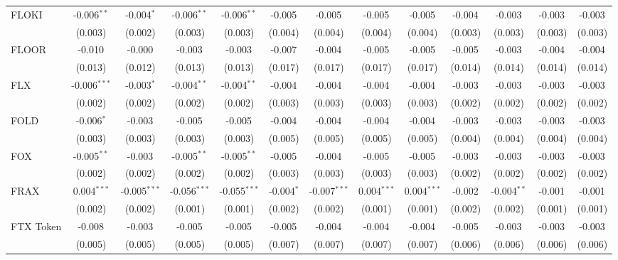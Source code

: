 \begin{table}[!htbp]
\begin{tabular}{@{\extracolsep{5pt}}lcccccccccccc}
 FLOKI & -0.006$^{**}$ & -0.004$^{*}$ & -0.006$^{**}$ & -0.006$^{**}$ & -0.005$^{}$ & -0.005$^{}$ & -0.005$^{}$ & -0.005$^{}$ & -0.004$^{}$ & -0.003$^{}$ & -0.003$^{}$ & -0.003$^{}$ \\
  & (0.003) & (0.002) & (0.003) & (0.003) & (0.004) & (0.004) & (0.004) & (0.004) & (0.003) & (0.003) & (0.003) & (0.003) \\
 FLOOR & -0.010$^{}$ & -0.000$^{}$ & -0.003$^{}$ & -0.003$^{}$ & -0.007$^{}$ & -0.004$^{}$ & -0.005$^{}$ & -0.005$^{}$ & -0.005$^{}$ & -0.003$^{}$ & -0.004$^{}$ & -0.004$^{}$ \\
  & (0.013) & (0.012) & (0.013) & (0.013) & (0.017) & (0.017) & (0.017) & (0.017) & (0.014) & (0.014) & (0.014) & (0.014) \\
 FLX & -0.006$^{***}$ & -0.003$^{*}$ & -0.004$^{**}$ & -0.004$^{**}$ & -0.004$^{}$ & -0.004$^{}$ & -0.004$^{}$ & -0.004$^{}$ & -0.003$^{}$ & -0.003$^{}$ & -0.003$^{}$ & -0.003$^{}$ \\
  & (0.002) & (0.002) & (0.002) & (0.002) & (0.003) & (0.003) & (0.003) & (0.003) & (0.002) & (0.002) & (0.002) & (0.002) \\
 FOLD & -0.006$^{*}$ & -0.003$^{}$ & -0.005$^{}$ & -0.005$^{}$ & -0.004$^{}$ & -0.004$^{}$ & -0.004$^{}$ & -0.004$^{}$ & -0.003$^{}$ & -0.003$^{}$ & -0.003$^{}$ & -0.003$^{}$ \\
  & (0.003) & (0.003) & (0.003) & (0.003) & (0.005) & (0.005) & (0.005) & (0.005) & (0.004) & (0.004) & (0.004) & (0.004) \\
 FOX & -0.005$^{**}$ & -0.003$^{}$ & -0.005$^{**}$ & -0.005$^{**}$ & -0.005$^{}$ & -0.004$^{}$ & -0.005$^{}$ & -0.005$^{}$ & -0.003$^{}$ & -0.003$^{}$ & -0.003$^{}$ & -0.003$^{}$ \\
  & (0.002) & (0.002) & (0.002) & (0.002) & (0.003) & (0.003) & (0.003) & (0.003) & (0.002) & (0.002) & (0.002) & (0.002) \\
 FRAX & 0.004$^{***}$ & -0.005$^{***}$ & -0.056$^{***}$ & -0.055$^{***}$ & -0.004$^{*}$ & -0.007$^{***}$ & 0.004$^{***}$ & 0.004$^{***}$ & -0.002$^{}$ & -0.004$^{**}$ & -0.001$^{}$ & -0.001$^{}$ \\
  & (0.002) & (0.002) & (0.001) & (0.001) & (0.002) & (0.002) & (0.001) & (0.001) & (0.002) & (0.002) & (0.001) & (0.001) \\
 FTX Token & -0.008$^{}$ & -0.003$^{}$ & -0.005$^{}$ & -0.005$^{}$ & -0.005$^{}$ & -0.004$^{}$ & -0.004$^{}$ & -0.004$^{}$ & -0.005$^{}$ & -0.003$^{}$ & -0.003$^{}$ & -0.003$^{}$ \\
  & (0.005) & (0.005) & (0.005) & (0.005) & (0.007) & (0.007) & (0.007) & (0.007) & (0.006) & (0.006) & (0.006) & (0.006) \\

\end{tabular}
\end{table}
